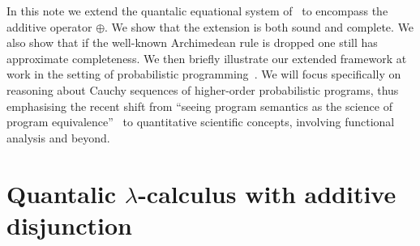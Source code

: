 \documentclass[a4paper,UKenglish,cleveref, autoref, thm-restate]{lipics-v2021}
\begin{document}

In this note we extend the quantalic equational system
of~\cite{dahlqvist22,dahlqvist2023syntactic} to encompass the additive operator
$\oplus$. We show that the extension is both sound and complete. We also show
that if the well-known Archimedean rule is dropped one still has approximate
completeness. We then briefly illustrate our extended framework at work in the
setting of probabilistic programming~\cite{dahlqvist19,barthe20}. We will focus
specifically on reasoning about Cauchy sequences of higher-order probabilistic
programs, thus emphasising the recent shift from ``seeing program semantics as
the science of program equivalence''~\cite{lago22} to quantitative
scientific concepts, involving functional analysis and beyond.







\section{Quantalic $\lambda$-calculus with additive disjunction }
\end{document}
